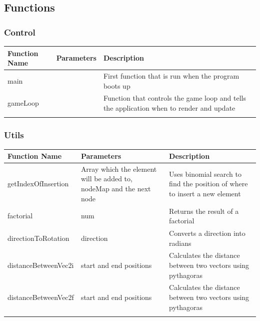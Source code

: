 \documentclass{article}
\begin{document}
        \subsection{Functions}
            \subsubsection{Control}
            \begin{center}
                \begin{tabular}{ | m{} | m{}| m{} | }
                    \hline
                    \textbf{Function Name} & \textbf{Parameters} & \textbf{Description} \\
                    \hline
                    main & & First function that is run when the program boots up \\
                    \hline
                    gameLoop & & Function that controls the game loop and tells the application when to render and update \\
                    \hline
                    & & \\
                    \hline
                \end{tabular}
            \end{center}
            \subsubsection{Utils}
            \begin{center}
                \begin{tabular}{ | m{} | m{}| m{} | }
                    \hline
                    \textbf{Function Name} & \textbf{Parameters} & \textbf{Description} \\
                    \hline
                    getIndexOfInsertion & Array which the element will be added to, nodeMap and the next node & Uses binomial search to find the position of where to insert a new element \\
                    \hline
                    factorial & num & Returns the result of a factorial \\
                    \hline
                    directionToRotation & direction & Converts a direction into radians \\
                    \hline
                    distanceBetweenVec2i & start and end positions & Calculates the distance between two vectors using pythagoras \\
                    \hline
                    distanceBetweenVec2f & start and end positions &  Calculates the distance between two vectors using pythagoras\\
                    \hline
                    & & \\
                    \hline
                \end{tabular}
            \end{center}
\end{document}
